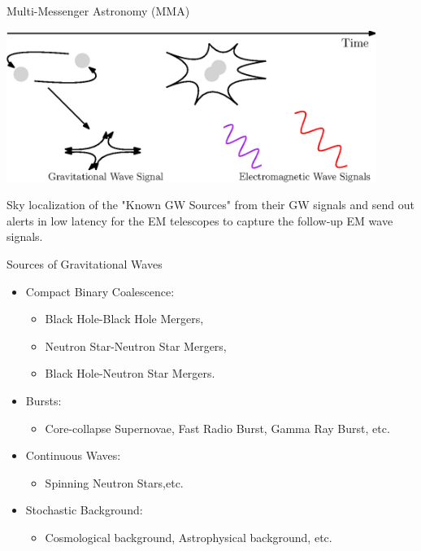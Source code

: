 \documentclass[xcolor=dvipsnames]{beamer}
\begin{document}
\begin{frame}[t]{Multi-Messenger Astronomy (MMA)}
  \begin{center}
    \includegraphics[width=0.9\textwidth]{image/BNS-MMA.eps}
  \end{center}
  Sky localization of the {\color{blue}"Known GW Sources"} from their GW signals and send out alerts in low latency for the EM telescopes to capture the follow-up EM wave signals.
\end{frame}

\begin{frame}[t]{Sources of Gravitational Waves}
  \begin{itemize}
    \item {\color{orange}Compact Binary Coalescence}:
    \begin{itemize}
      \item Black Hole-Black Hole Mergers,
      \item Neutron Star-Neutron Star Mergers,
      \item Black Hole-Neutron Star Mergers.
    \end{itemize}
    \item {\color{green}Bursts}:
    \begin{itemize}
      \item Core-collapse Supernovae, Fast Radio Burst, Gamma Ray Burst, etc.
    \end{itemize}
    \item {\color{blue}Continuous Waves}:
    \begin{itemize}
      \item Spinning Neutron Stars,etc.
    \end{itemize}
    \item Stochastic Background:
    \begin{itemize}
      \item Cosmological background, Astrophysical background, etc.
    \end{itemize}
  \end{itemize}
\end{frame}
\end{document}
